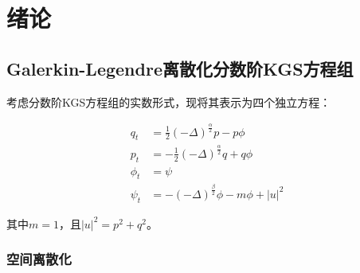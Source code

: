 
\chapter{绪论}
\label{cha:intro}




\section{Galerkin-Legendre离散化分数阶KGS方程组}

考虑分数阶KGS方程组的实数形式，现将其表示为四个独立方程：

\begin{align}
q_t &= \frac{1}{2}(-\Delta)^{\frac{\alpha}{2}}p - p\phi \label{eq:q} \\
p_t &= -\frac{1}{2}(-\Delta)^{\frac{\alpha}{2}}q + q\phi \label{eq:p} \\
\phi_t &= \psi \label{eq:phi} \\
\psi_t &= -(-\Delta)^{\frac{\beta}{2}}\phi - m\phi + |u|^2 \label{eq:psi}
\end{align}

其中$m=1$，且$|u|^2 = p^2 + q^2$。

\subsection{空间离散化}

